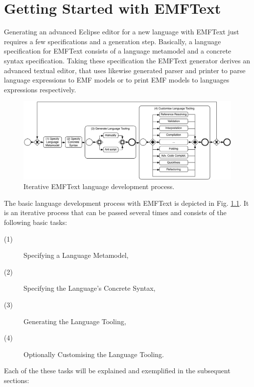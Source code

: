 \chapter{Getting Started with EMFText}

	Generating an advanced Eclipse editor for a new language with EMFText just
	requires a few specifications and a generation step. 
	Basically, a language specification for EMFText consists of a language
	metamodel and a concrete syntax specification. Taking these specification the EMFText
	generator derives an advanced textual editor, that uses likewise generated
	parser and printer to parse language expressions to EMF models or to print EMF models to
	languages expressions respectively. 
	
	\begin{figure}[ht]
	\centering
		\includegraphics[scale=0.5]{figures/process}
	\caption{Iterative EMFText language development process.}
	\label{fig:process}
	\end{figure}
	
	\noindent The basic language development process with EMFText is depicted in
	Fig. \ref{fig:process}. It is an iterative process that can be passed several
	times and consists of the following basic tasks:
	\begin{description}
	  \item[(1)] Specifying a Language Metamodel,
	  \item[(2)] Specifying the Language's Concrete Syntax,
	  \item[(3)] Generating the Language Tooling,
	  \item[(4)] Optionally Customising the Language Tooling.
	\end{description}
	
	
	
	Each of the these tasks
	will be explained and exemplified in the subsequent sections:
	
